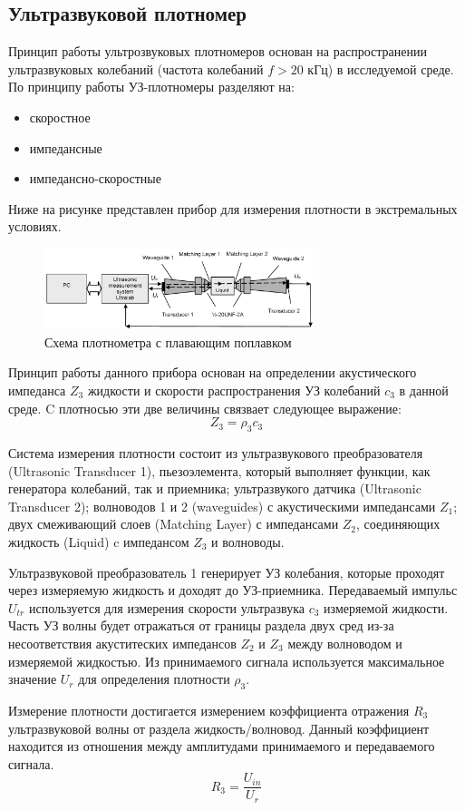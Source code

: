 \documentclass[russian, utf8, 12pt]{eskdtext}
\begin{document}
\newpage

\subsection{Ультразвуковой плотномер}

Принцип работы ультрозвуковых плотномеров основан на распространении ультразвуковых колебаний (частота колебаний $ f > 20$ кГц) в исследуемой среде. По принципу работы УЗ-плотномеры разделяют на:
\begin{itemize}
	\item скоростное
	\item импедансные
	\item импедансно-скоростные
\end{itemize}

Ниже на рисунке представлен прибор для измерения плотности в экстремальных условиях. 
\begin{figure}[h!]
	\centering
	\includegraphics[width = 0.7\textwidth] {UltrasonicMeasuringSensor.png}
	\caption{Схема плотнометра с плавающим поплавком}
\end{figure}

Принцип работы данного прибора основан на определении акустического импеданса $Z_3$ жидкости и скорости распространения УЗ колебаний $c_3$ в данной среде. C плотносью эти две величины связвает следующее выражение: 
\begin{equation}
	Z_3 = \rho_3 c_3
\end{equation}

Система измерения плотности состоит из ультразвукового преобразователя (Ultrasonic Transducer 1), пьезоэлемента, который выполняет функции, как генератора колебаний, так и приемника; ультразвукого датчика (Ultrasonic Transducer 2); волноводов 1 и 2 (waveguides) с акустическими импедансами $Z_1$; двух смеживающий слоев (Matching Layer) с импедансами $Z_2$, соединяющих жидкость (Liquid) c импедансом $Z_3$ и волноводы. \par 

Ультразвуковой преобразователь 1 генерирует УЗ колебания, которые проходят через измеряемую жидкость и доходят до УЗ-приемника. Передаваемый импульс $U_{tr}$ используется для измерения скорости ультразвука $c_3$ измеряемой жидкости. Часть УЗ волны будет отражаться от границы раздела двух сред из-за несоответствия акуститеских импедансов $Z_2$ и $Z_3$ между волноводом и измеряемой жидкостью. Из принимаемого сигнала используется максимальное значение $U_r$ для определения плотности $\rho_3$. \par
Измерение плотности достигается измерением коэффициента отражения $R_3$ ультразвуковой волны от раздела жидкость/волновод. Данный коэффициент находится из отношения между амплитудами принимаемого и передаваемого сигнала.
\begin{equation}
	R_3 = \frac{U_{in}}{U_r}
\end{equation}
\end{document}
